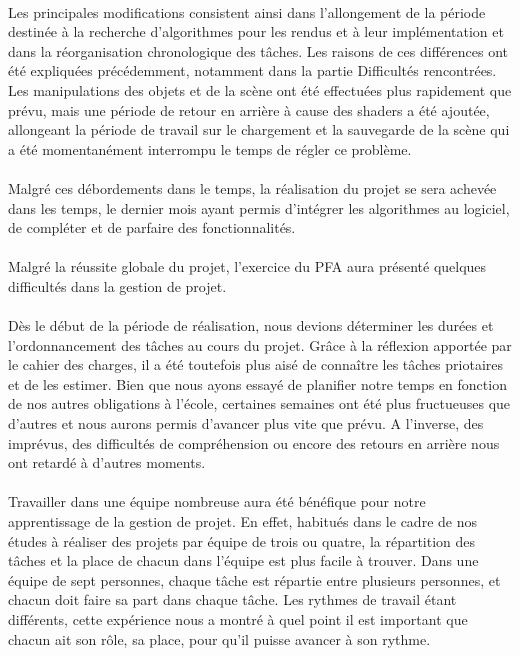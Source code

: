 \paragraph{}
Les principales modifications consistent ainsi dans l'allongement de la période destinée à la recherche d'algorithmes pour les rendus et à leur implémentation et dans la réorganisation chronologique des tâches. Les raisons de ces différences ont été expliquées précédemment, notamment dans la partie Difficultés rencontrées.
Les manipulations des objets et de la scène ont été effectuées plus rapidement que prévu, mais une période de retour en arrière à cause des shaders a été ajoutée, allongeant la période de travail sur le chargement et la sauvegarde de la scène qui a été momentanément interrompu le temps de régler ce problème.

\paragraph{}
Malgré ces débordements dans le temps, la réalisation du projet se sera achevée dans les temps, le dernier mois ayant permis d'intégrer les algorithmes au logiciel, de compléter et de parfaire des fonctionnalités.

\paragraph{}
Malgré la réussite globale du projet, l'exercice du PFA aura présenté quelques difficultés dans la gestion de projet.

\paragraph{}
Dès le début de la période de réalisation, nous devions déterminer les durées et l'ordonnancement des tâches au cours du projet. Grâce à la réflexion apportée par le cahier des charges, il a été toutefois plus aisé de connaître les tâches priotaires et de les estimer. Bien que nous ayons essayé de planifier notre temps en fonction de nos autres obligations à l'école, certaines semaines ont été plus fructueuses que d'autres et nous aurons permis d'avancer plus vite que prévu. A l'inverse, des imprévus, des difficultés de compréhension ou encore des retours en arrière nous ont retardé à d'autres moments.

\paragraph{}
Travailler dans une équipe nombreuse aura été bénéfique pour notre apprentissage de la gestion de projet. En effet, habitués dans le cadre de nos études à réaliser des projets par équipe de trois ou quatre, la répartition des tâches et la place de chacun dans l'équipe est plus facile à trouver. Dans une équipe de sept personnes, chaque tâche est répartie entre plusieurs personnes, et chacun doit faire sa part dans chaque tâche. Les rythmes de travail étant différents, cette expérience nous a montré à quel point il est important que chacun ait son rôle, sa place, pour qu'il puisse avancer à son rythme.

